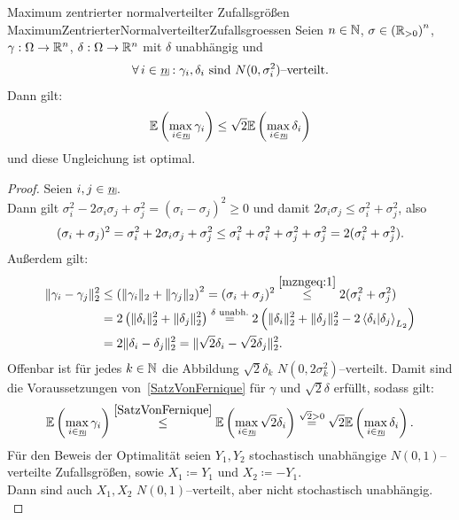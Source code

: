 \begin{korollar}{Maximum zentrierter normalverteilter Zufallsgrößen}
             {MaximumZentrierterNormalverteilterZufallsgroessen}
Seien $n \in \mathbb{N}$, $\sigma \in \left(\mathbb{R}_{>0}\right)^n$,
$\gamma: \Omega \rightarrow \mathbb{R}^n$, $\delta: \Omega \rightarrow \mathbb{R}^n$ mit
$\delta$ unabhängig und
\[\forall\, i \in \haken n: \gamma_i, \delta_i \text{ sind }
N(0,\sigma_i^2)\text{--verteilt.}\]
Dann gilt:
\[\E\left(\max_{i \in \haken n}\gamma_i \right)
\le \sqrt 2 \E\left(\max_{i \in \haken n}\delta_i\right)\]
und diese Ungleichung ist optimal.
\end{korollar}
\begin{proof}
Seien $i, j \in \haken n$.\\
Dann gilt $\sigma_i^2 - 2\sigma_i\sigma_j +\sigma_j^2
= (\sigma_i - \sigma_j)^2 \ge 0$ und damit $2 \sigma_i\sigma_j \le
\sigma_i^2 + \sigma_j^2$, also
\begin{align}
(\sigma_i + \sigma_j)^2 = \sigma_i^2 + 2 \sigma_i\sigma_j + \sigma_j^2
\le \sigma_i^2 + \sigma_i^2 + \sigma_j^2 + \sigma_j^2 
= 2(\sigma_i^2 + \sigma_j^2) \text. \label{mzngeq:1}
\end{align}
Außerdem gilt:
\begin{align*}
\lVert\gamma_i - \gamma_j\rVert_2^2 
&\le \left(\lVert\gamma_i\rVert_2 + \lVert\gamma_j\rVert_2 \right)^2
= (\sigma_i + \sigma_j)^2 \overset{\eqref{mzngeq:1}}\le 
2(\sigma_i^2 + \sigma_j^2)\\
&= 2\left(\lVert\delta_i\rVert_2^2 + \lVert\delta_j\rVert_2^2 \right)
\overset{\delta \text{ unabh.}}=
2 \left(\lVert\delta_i\rVert_2^2 + \lVert\delta_j\rVert_2^2 
- 2 \left\langle \delta_i |\delta_j\right\rangle_{L_2} \right)\\
&= 2\lVert\delta_i - \delta_j\rVert_2^2 =
\lVert\sqrt 2 \delta_i - \sqrt 2 \delta_j\rVert_2^2\text.
\end{align*}
Offenbar ist für jedes $k\in \mathbb{N}$ die Abbildung $\sqrt 2\delta_k$
$N(0, 2\sigma_k^2)$--verteilt. Damit sind die Voraussetzungen von~\ref{SatzVonFernique} für $\gamma$ und $\sqrt 2 \delta$ erfüllt, sodass gilt:
\[\E\left(\max_{i \in \haken n}\gamma_i \right)
\overset{\ref{SatzVonFernique}}\le
\E\left(\max_{i \in \haken n}\sqrt 2\delta_i\right)
\overset{\sqrt 2>0}=\sqrt 2\E\left(\max_{i \in \haken n}\delta_i\right)\text.\]
Für den Beweis der Optimalität seien $Y_1, Y_2$ stochastisch unabhängige
$N(0,1)$--verteilte Zufallsgrößen, sowie $X_1 \coloneqq Y_1$ und $X_2\coloneqq -Y_1$.\\
Dann sind auch $X_1, X_2$ $N(0,1)$--verteilt, aber nicht stochastisch
unabhängig.\\

\end{proof}
